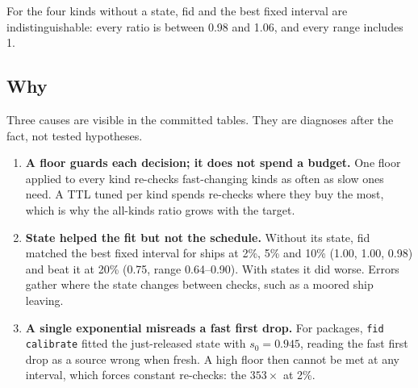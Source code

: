 For the four kinds without a state, fid and the best fixed interval are
indistinguishable: every ratio is between 0.98 and 1.06, and every range
includes 1.

\subsection{Why}

Three causes are visible in the committed tables. They are diagnoses
after the fact, not tested hypotheses.

\begin{enumerate}
  \item \textbf{A floor guards each decision; it does not spend a budget.}
    One floor applied to every kind re-checks fast-changing kinds as often
    as slow ones need. A TTL tuned per kind spends re-checks where they
    buy the most, which is why the all-kinds ratio grows with the target.
  \item \textbf{State helped the fit but not the schedule.} Without its
    state, fid matched the best fixed interval for ships at 2\%, 5\% and
    10\% (1.00, 1.00, 0.98) and beat it at 20\% (0.75, range 0.64--0.90).
    With states it did worse. Errors gather where the state changes between
    checks, such as a moored ship leaving.
  \item \textbf{A single exponential misreads a fast first drop.} For
    packages, \texttt{fid calibrate} fitted the just-released state with
    $s_0 = 0.945$, reading the fast first drop as a source wrong when fresh.
    A high floor then cannot be met at any interval, which forces constant
    re-checks: the $353\times$ at 2\%.
\end{enumerate}

